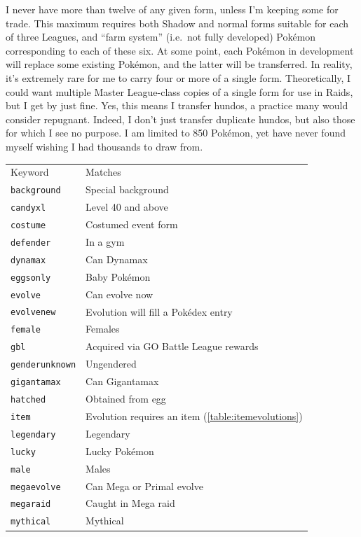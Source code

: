 I never have more than twelve of any given form, unless I'm keeping some for trade.
This maximum requires both Shadow and normal forms suitable for each of three Leagues,
 and ``farm system'' (i.e.\ not fully developed) Pokémon corresponding to each of these six.
At some point, each Pokémon in development will replace some existing Pokémon, and the
 latter will be transferred.
In reality, it's extremely rare for me to carry four or more of a single form.
Theoretically, I could want multiple Master League-class copies of a single form for
 use in Raids, but I get by just fine.
Yes, this means I transfer hundos, a practice many would consider repugnant.
Indeed, I don't just transfer duplicate hundos, but also those for which I see no purpose.
I am limited to 850 Pokémon, yet have never found myself wishing I had thousands to draw from.
\begin{table}
\centering\small
\begin{tabular}{ll}
Keyword & Matches \\
\Midrule
\texttt{background} & Special background \\
\texttt{candyxl} & Level 40 and above \\
\texttt{costume} & Costumed event form \\
\texttt{defender} & In a gym \\
\texttt{dynamax} & Can Dynamax\\
\texttt{eggsonly} & Baby Pokémon \\
\texttt{evolve} & Can evolve now\\
\texttt{evolvenew} & Evolution will fill a Pokédex entry\\
\texttt{female} & Females \\
\texttt{gbl} & Acquired via GO Battle League rewards\\
\texttt{genderunknown} & Ungendered \\
\texttt{gigantamax} & Can Gigantamax\\
\texttt{hatched} & Obtained from egg \\
\texttt{item} & Evolution requires an item (\autoref{table:itemevolutions})\\
\texttt{legendary} & Legendary \\
\texttt{lucky} & Lucky Pokémon \\
\texttt{male} & Males\\
\texttt{megaevolve} & Can Mega or Primal evolve\\
\texttt{megaraid} & Caught in Mega raid\\
\texttt{mythical} & Mythical\\

\end{tabular}
\end{table}
